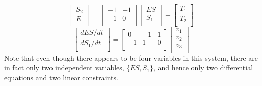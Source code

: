 \documentclass[12pt]{article}
\begin{document}
\begin{boxedminipage}[hbp]{14cm}
$$
\left[ \begin{array}{l}
  S_2 \\
  E \\
\end{array} \right] =
\left[ \begin{array}{rr}
  -1 & -1 \\
  -1 & 0 \\
\end{array}  \right]
\left[
\begin{array}{l}
    ES \\
    S_1 \\
\end{array}
\right] +
\left[
\begin{array}{l}
  T_1 \\
  T_2 \\
\end{array}
\right]$$
$$\left[
\begin{array}{l}
  dES/dt \\
  dS_1/dt \\
\end{array}
\right] =
\left[
\begin{array}{rrr}
  0 & -1 & 1 \\
  -1 & 1 & 0 \\
\end{array}
\right]
\left[
\begin{array}{l}
  v_1 \\
  v_2 \\
  v_3 \\
\end{array}
\right]$$ Note that even though there appears to be four variables
in this system, there are in fact only two independent variables, $\{ES, S_1\}$,
and hence only two differential equations and two linear constraints.

\end{boxedminipage}
\end{document}
